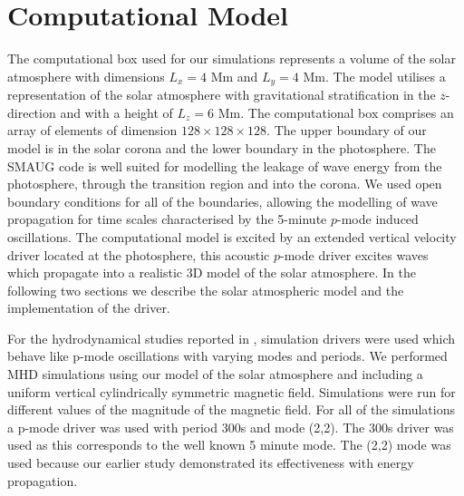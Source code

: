 \documentclass[twocolumn]{aastex62}
\begin{document}
\break

\section{Computational Model}
The computational box used for our simulations represents a volume of the solar atmosphere  with dimensions $L_{ x}= 4$ Mm and $L_{y} =4$ Mm. The model utilises a representation of the solar atmosphere with gravitational stratification in the $z$-direction and with a height of $L_{z} =6$ Mm. The computational box comprises an array of elements of dimension $128 \times128 \times128$. The upper boundary of our model  is in the solar corona and the lower boundary in the photosphere. The SMAUG code is well suited for modelling the leakage of wave energy from the photosphere, through the transition region and into the corona. We used open boundary conditions for all of the boundaries, allowing the modelling of wave propagation for time scales characterised by the 5-minute $p$-mode induced oscillations. The computational model is excited by an extended vertical velocity driver located at the photosphere, this acoustic $p$-mode driver excites waves which propagate into a realistic 3D model of the solar atmosphere. In the following two sections we describe the solar atmospheric model and the implementation of the driver. 

For the hydrodynamical studies reported in  \citet{Griffiths2018}, simulation drivers were used which behave like p-mode oscillations with varying modes and periods. We performed MHD simulations using our model of the solar atmosphere and including a uniform vertical cylindrically symmetric magnetic field. Simulations were run for different values of the magnitude of the magnetic field. For all of the simulations a p-mode driver was used with period 300s and mode (2,2). The 300s driver  was used as this corresponds to the well known 5 minute mode. The (2,2) mode was used because our earlier study demonstrated its effectiveness with energy propagation.


\end{document}
